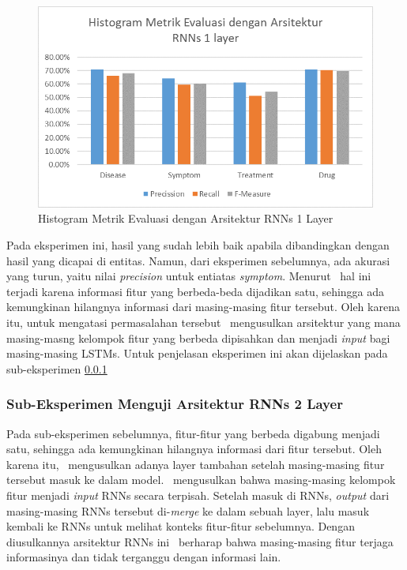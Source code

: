     \begin{figure}
    	\centering
    	\includegraphics[width=0.85\linewidth]{images/histogram9}
    	\caption{Histogram Metrik Evaluasi dengan Arsitektur RNNs 1 Layer}
    	\label{fig:owndict9}
    \end{figure}
    
    Pada eksperimen ini, hasil yang sudah lebih baik apabila dibandingkan dengan hasil yang dicapai \cite{skripsiKakRadit} di entitas. Namun, dari eksperimen sebelumnya, ada akurasi yang turun, yaitu nilai \textit{precision} untuk entiatas \textit{symptom}. Menurut \saya~hal ini terjadi karena informasi fitur yang berbeda-beda dijadikan satu, sehingga ada kemungkinan hilangnya informasi dari masing-masing fitur tersebut. Oleh karena itu, untuk mengatasi permasalahan tersebut \saya~mengusulkan arsitektur yang mana masing-masng kelompok fitur yang berbeda dipisahkan dan menjadi \textit{input} bagi masing-masing LSTMs. Untuk penjelasan eksperimen ini akan dijelaskan pada sub-eksperimen \ref{eks2:subeksrnn2}
    
    
    \subsubsection{Sub-Eksperimen Menguji Arsitektur RNNs 2 Layer}\label{eks2:subeksrnn2}
    Pada sub-eksperimen sebelumnya, fitur-fitur yang berbeda digabung menjadi satu, sehingga ada kemungkinan hilangnya informasi dari fitur tersebut. Oleh karena itu, \saya~mengusulkan adanya layer tambahan setelah masing-masing fitur tersebut masuk ke dalam model. \Saya~mengusulkan bahwa masing-masing kelompok fitur menjadi \textit{input} RNNs secara terpisah. Setelah masuk di RNNs, \textit{output} dari masing-masing RNNs tersebut di-\textit{merge} ke dalam sebuah layer, lalu masuk kembali ke RNNs untuk melihat konteks fitur-fitur sebelumnya. Dengan diusulkannya arsitektur RNNs ini \saya~berharap bahwa masing-masing fitur terjaga informasinya dan tidak terganggu dengan informasi lain.
    
